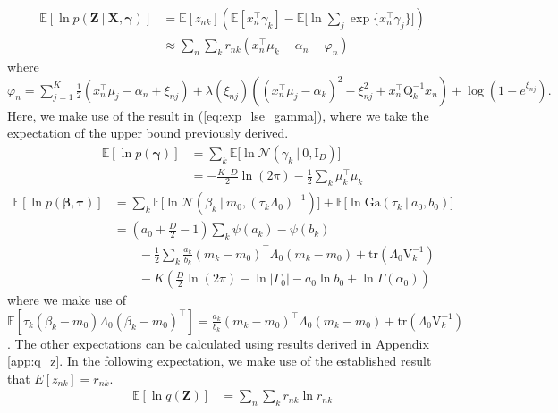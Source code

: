 \documentclass[twoside,11pt]{article}
\newcommand{\tr}{\intercal}
\newcommand{\eye}{\mathrm{I}}
\newcommand\given[1][]{\:#1\vert\:}
\newcommand{\transpose}[1]{#1^{\intercal}}
\newcommand{\nsum}{\sum_{n}}
\newcommand{\ksum}{\sum_{k}}
\newcommand{\boldbeta}{\boldsymbol\beta}
\newcommand{\boldgamma}{\boldsymbol\gamma}
\newcommand{\boldtau}{\boldsymbol\tau}
\newcommand{\E}{\mathbb{E}}
\newcommand{\pr}[1]{p \left( #1 \right)}
\begin{document}
\begin{equation} \label{eq:e2_deriv}
\begin{split}
	\E[\ln \pr{\mathbf{Z} \given \mathbf{X}, \boldgamma}] &= \E[z_{nk}] \left( \E[\transpose{x_n} \gamma_k] - \E\Big[\ln \sum_{j} \exp \{ \transpose{x_n}\gamma_j\}\Big]\right)\\
	&\approx \nsum \ksum r_{nk} \left( \transpose{x_n}\mu_k - \alpha_n - \varphi_n \right)
\end{split}
\end{equation}
where $\varphi_n = \sum\limits_{j=1}^K \frac{1}{2}\left(x_n^{\tr}\mu_j - \alpha_n + \xi_{nj}\right) + \lambda(\xi_{nj}) \left( (x_n^{\tr} \mu_j - \alpha_k)^2 - \xi_{nj}^2 + x_n^{\tr} \mathrm{Q}_k^{-1} x_n \right) + \log( 1 + e^{\xi_{nj}}).$
Here, we make use of the result in (\ref{eq:exp_lse_gamma}), where we take the expectation of the upper bound previously derived. 
\begin{equation} \label{eq:e3_deriv}
\begin{split}
	\E[\ln \pr{\boldgamma}] &= \ksum \E \Big[ \ln \mathcal{N}\left( \gamma_k \given 0, \eye_D\right)\Big] \\
	&= -\frac{K \cdot D}{2} \ln (2\pi) - \frac{1}{2} \ksum \transpose{\mu_k}\mu_k
\end{split}
\end{equation}
\begin{equation} \label{eq:e4_deriv} %
\begin{split}
	\E[\ln \pr{\boldbeta, \boldtau}] &= \ksum \E\Big[\ln \mathcal{N}\left( \beta_k \given m_0, \left(\tau_k \Lambda_0 \right)^{-1} \right)\Big] + \E\Big[\ln \mathrm{Ga}\left( \tau_k \given a_0, b_0\right)\Big]\\
	&= \left( a_0 + \frac{D}{2} - 1 \right) \ksum \psi(a_k) - \psi(b_k)  \\
	& \qquad - \frac{1}{2} \ksum \frac{a_k}{b_k} \transpose{(m_k - m_0)} \Lambda_0 (m_k - m_0) + \mathrm{tr} \left( \Lambda_0 \mathrm{V}_{k}^{-1}\right)\\
	& \qquad - K \left(\frac{D}{2}\ln(2\pi)  - \ln |\Gamma_0| - a_0 \ln b_0 + \ln \Gamma(\alpha_0) \right)
\end{split}
\end{equation}
where we make use of $\E[\tau_k\transpose{(\beta_k - m_0) \Lambda_0 (\beta_k - m_0)}] =  \frac{a_k}{b_k} \transpose{(m_k - m_0)} \Lambda_0 (m_k - m_0) + \mathrm{tr} \left( \Lambda_0 \mathrm{V}_{k}^{-1}\right)$. The other expectations can be calculated using results derived in Appendix \ref{app:q_z}. In the following expectation, we make use of the established result that $E[z_{nk}] = r_{nk}$. 
\begin{equation} \label{eq:e5_deriv}
\begin{split}
	\E[\ln q(\mathbf{Z})] &=  \nsum \ksum r_{nk} \ln r_{nk}
\end{split}
\end{equation}
\end{document}
